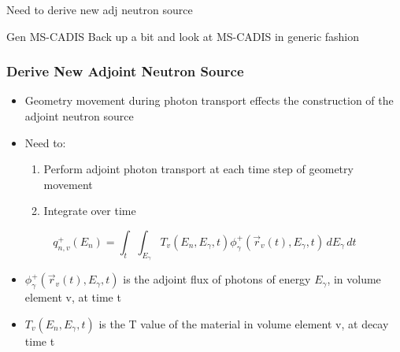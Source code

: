 \documentclass{beamer}
\begin{document}
\begin{frame}{Need to derive new adj neutron source}
\end{frame}
\begin{frame}{Gen MS-CADIS}
Back up a bit and look at MS-CADIS in generic fashion
\end{frame}

\begin{frame}
\frametitle{Derive New Adjoint Neutron Source}
	\begin{itemize}
		\item{Geometry movement during photon transport effects the
			construction of the adjoint neutron source}
		\item{Need to:}
			\begin{enumerate}
				\item{Perform adjoint photon transport at each
					time step of geometry movement}
				\item{Integrate over time}
			\end{enumerate}
	\end{itemize}

  \begin{equation}\label{eq:adj_src_1_avg}
	 q_{n,v}^{+}(E_{n}) =
	 \int_{t}  \int_{E_{\gamma}}
	 T_{v}(E_n, E_{\gamma}, t) 
	 \phi_{\gamma}^{+}(\overrightarrow{r}_{v}(t), E_{\gamma},t)
	 \, dE_{\gamma} \, dt
  \end{equation}

\begin{itemize}
\item{$\phi_{\gamma}^{+}(\overrightarrow{r}_{v}(t), E_{\gamma},t) $ is the 
adjoint flux of photons of energy $E_{\gamma}$, in volume element v, at time t}
\item{$T_{v}(E_n, E_{\gamma}, t) $ is the T value of the material in volume
		element v, at decay time t}
\end{itemize}
\end{frame}
\end{document}
